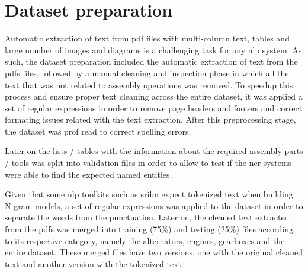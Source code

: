 \section{Dataset preparation}\label{sec:dataset-preparation}

Automatic extraction of text from \gls{pdf} files with multi-column text, tables and large number of images and diagrams is a challenging task for any \gls{nlp} system. As such, the dataset preparation included the automatic extraction of text from the \glspl{pdf} files, followed by a manual cleaning and inspection phase in which all the text that was not related to assembly operations was removed. To speedup this process and ensure proper text cleaning across the entire dataset, it was applied a set of regular expressions in order to remove page headers and footers and correct formating issues related with the text extraction. After this preprocessing stage, the dataset was prof read to correct spelling errors.

Later on the lists / tables with the information about the required assembly parts / tools was split into validation files in order to allow to test if the \gls{ner} systems were able to find the expected named entities.

Given that some \gls{nlp} toolkits such as \gls{srilm} \cite{Stolcke2002} expect tokenized text when building N-gram models, a set of regular expressions was applied to the dataset in order to separate the words from the punctuation. Later on, the cleaned text extracted from the \glspl{pdf} was merged into training (75\%) and testing (25\%) files according to its respective category, namely the alternators, engines, gearboxes and the entire dataset. These merged files have two versions, one with the original cleaned text and another version with the tokenized text.
